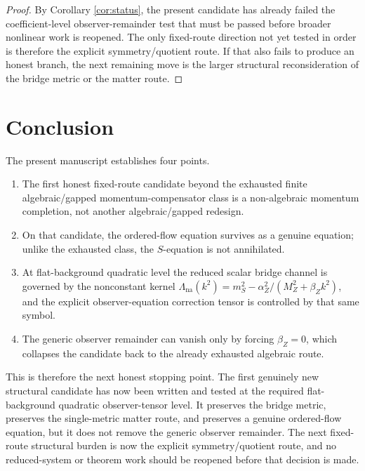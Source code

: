 \documentclass[11pt]{article}
\begin{document}
\begin{proof}
By Corollary \ref{cor:status}, the present candidate has already failed the coefficient-level observer-remainder test that must be passed before broader nonlinear work is reopened. The only fixed-route direction not yet tested in order is therefore the explicit symmetry/quotient route. If that also fails to produce an honest branch, the next remaining move is the larger structural reconsideration of the bridge metric or the matter route.
\end{proof}

\section{Conclusion}

The present manuscript establishes four points.
\begin{enumerate}
    \item The first honest fixed-route candidate beyond the exhausted finite algebraic/gapped momentum-compensator class is a non-algebraic momentum completion, not another algebraic/gapped redesign.
    \item On that candidate, the ordered-flow equation survives as a genuine equation; unlike the exhausted class, the \(S\)-equation is not annihilated.
    \item At flat-background quadratic level the reduced scalar bridge channel is governed by the nonconstant kernel \(\Lambda_{\mathrm{na}}(k^2)=m_S^2-\alpha_Z^2/(M_Z^2+\beta_Zk^2)\), and the explicit observer-equation correction tensor is controlled by that same symbol.
    \item The generic observer remainder can vanish only by forcing \(\beta_Z=0\), which collapses the candidate back to the already exhausted algebraic route.
\end{enumerate}

This is therefore the next honest stopping point. The first genuinely new structural candidate has now been written and tested at the required flat-background quadratic observer-tensor level. It preserves the bridge metric, preserves the single-metric matter route, and preserves a genuine ordered-flow equation, but it does not remove the generic observer remainder. The next fixed-route structural burden is now the explicit symmetry/quotient route, and no reduced-system or theorem work should be reopened before that decision is made.
\end{document}
